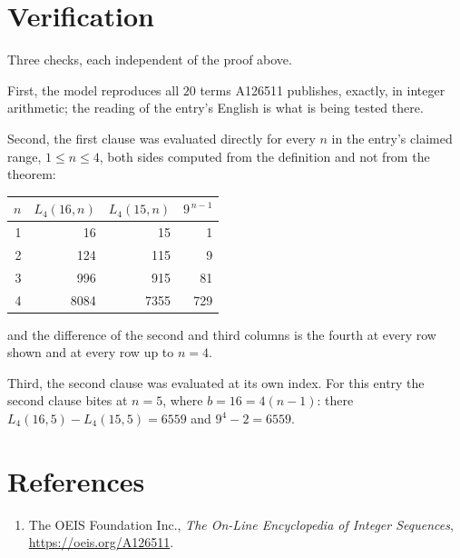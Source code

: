 \documentclass[11pt,a4paper]{article}
\theoremstyle{plain}
\theoremstyle{definition}
\begin{document}
\section{Verification}

Three checks, each independent of the proof above.

First, the model reproduces all $20$ terms A126511 publishes, exactly, in integer
arithmetic; the reading of the entry's English is what is being tested there.

Second, the first clause was evaluated directly for every $n$ in the entry's claimed range,
$1\le n\le4$, both sides computed from the definition and not from the theorem:

\begin{center}
\begin{tabular}{rrrr}
$n$ & $L_{4}(16,n)$ & $L_{4}(15,n)$ & $9^{\,n-1}$ \\ \hline
1 & 16 & 15 & 1 \\
2 & 124 & 115 & 9 \\
3 & 996 & 915 & 81 \\
4 & 8084 & 7355 & 729 \\
\end{tabular}
\end{center}

\noindent and the difference of the second and third columns is the fourth at every row shown
and at every row up to $n=4$.

Third, the second clause was evaluated at its own index. For this entry the second clause bites at $n=5$, where $b=16=4(n-1)$: there $L_{4}(16,5)-L_{4}(15,5)=6559$ and $9^{4}-2=6559$.

\section*{References}
\begin{enumerate}
\item The OEIS Foundation Inc., \emph{The On-Line Encyclopedia of Integer Sequences},
\url{https://oeis.org/A126511}.
\end{enumerate}
\end{document}
